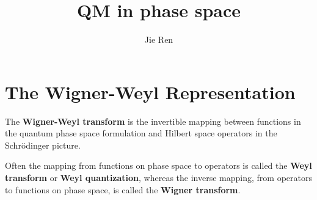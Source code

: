 \documentclass[aps,prb,superscriptaddress]{revtex4}
\begin{document}
\title{QM in phase space}
\author{Jie Ren}
\maketitle

\section{The Wigner-Weyl Representation}
The \textbf{Wigner-Weyl transform} is the invertible mapping between functions in the quantum phase space formulation and Hilbert space operators in the Schrödinger picture.

Often the mapping from functions on phase space to operators is called the \textbf{Weyl transform} or \textbf{Weyl quantization}, whereas the inverse mapping, from operators to functions on phase space, is called the \textbf{Wigner transform}.
\end{document}

